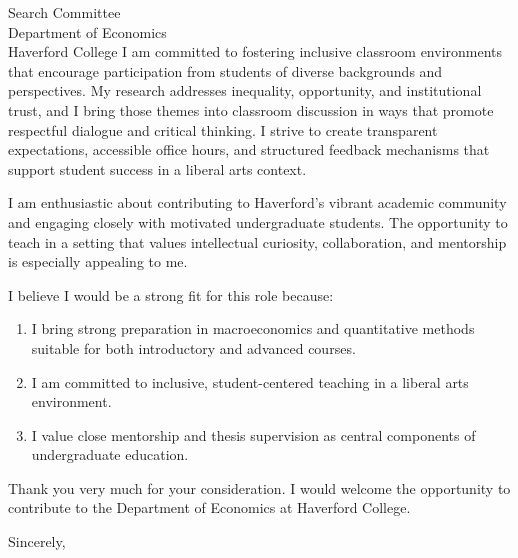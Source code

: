 \documentclass[11pt,letterpaper]{letter}
\begin{document}
\begin{letter}{
Search Committee \\
Department of Economics \\
Haverford College
}
I am committed to fostering inclusive classroom environments that encourage participation from students of diverse backgrounds and perspectives. My research addresses inequality, opportunity, and institutional trust, and I bring those themes into classroom discussion in ways that promote respectful dialogue and critical thinking. I strive to create transparent expectations, accessible office hours, and structured feedback mechanisms that support student success in a liberal arts context.

I am enthusiastic about contributing to Haverford’s vibrant academic community and engaging closely with motivated undergraduate students. The opportunity to teach in a setting that values intellectual curiosity, collaboration, and mentorship is especially appealing to me.

I believe I would be a strong fit for this role because:
\begin{enumerate}
    \item I bring strong preparation in macroeconomics and quantitative methods suitable for both introductory and advanced courses.
    \item I am committed to inclusive, student-centered teaching in a liberal arts environment.
    \item I value close mentorship and thesis supervision as central components of undergraduate education.
\end{enumerate}

Thank you very much for your consideration. I would welcome the opportunity to contribute to the Department of Economics at Haverford College.

\closing{Sincerely,}

\end{letter}
\end{document}
